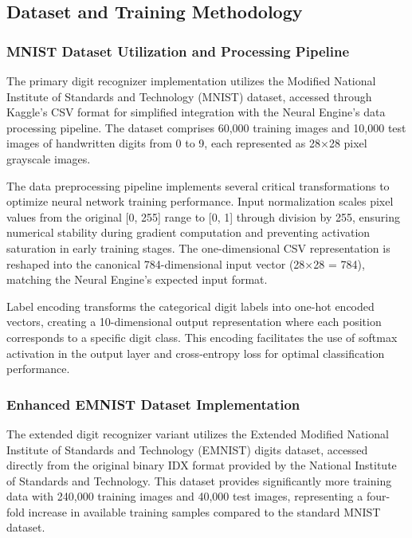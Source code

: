 \documentclass[11pt,a4paper]{report}
\begin{document}
\subsection{Dataset and Training Methodology}

\subsubsection{MNIST Dataset Utilization and Processing Pipeline}

The primary digit recognizer implementation utilizes the Modified National Institute of Standards and Technology (MNIST) dataset, accessed through Kaggle's CSV format for simplified integration with the Neural Engine's data processing pipeline. The dataset comprises 60,000 training images and 10,000 test images of handwritten digits from 0 to 9, each represented as 28×28 pixel grayscale images.

The data preprocessing pipeline implements several critical transformations to optimize neural network training performance. Input normalization scales pixel values from the original [0, 255] range to [0, 1] through division by 255, ensuring numerical stability during gradient computation and preventing activation saturation in early training stages. The one-dimensional CSV representation is reshaped into the canonical 784-dimensional input vector (28×28 = 784), matching the Neural Engine's expected input format.

Label encoding transforms the categorical digit labels into one-hot encoded vectors, creating a 10-dimensional output representation where each position corresponds to a specific digit class. This encoding facilitates the use of softmax activation in the output layer and cross-entropy loss for optimal classification performance.

\subsubsection{Enhanced EMNIST Dataset Implementation}

The extended digit recognizer variant utilizes the Extended Modified National Institute of Standards and Technology (EMNIST) digits dataset, accessed directly from the original binary IDX format provided by the National Institute of Standards and Technology. This dataset provides significantly more training data with 240,000 training images and 40,000 test images, representing a four-fold increase in available training samples compared to the standard MNIST dataset.
\end{document}
